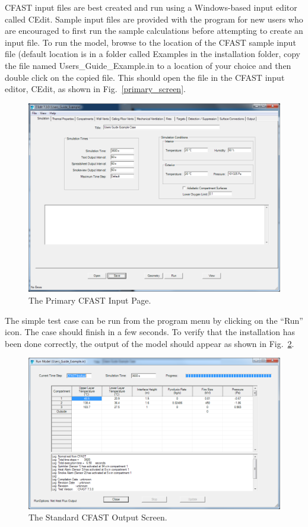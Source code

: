 CFAST input files are best created and run using a Windows-based input editor called CEdit. Sample input files are provided with the program for new users who are encouraged to first run the sample calculations before attempting to create an input file. To run the model, browse to the location of the CFAST sample input file (default location is in a folder called {\ct Examples} in the installation folder, copy the file named {\ct Users\_Guide\_Example.in} to a location of your choice and then double click on the copied file. This should open the file in the CFAST input editor, CEdit, as shown in Fig.~\ref{primary_screen}.
\begin{figure}[h!]
\includegraphics[width=6.5in]{FIGURES/Environment_Tab}
\caption[The Primary CFAST Input Page]{The Primary CFAST Input Page.}
\label{primary_screen}
\label{Figure 1.1}
\end{figure}
The simple test case can be run from the program menu by clicking on the ``Run'' icon. The case should finish in a few seconds. To verify that the installation has been done correctly, the output of the model should appear as shown in Fig.~\ref{Run_Model}.
\begin{figure}[h!]
\includegraphics[width=6.5in]{FIGURES/Standard_Output}
\caption[The Standard CFAST Output Screen]{The Standard CFAST Output Screen.}
\label{Run_Model}
\end{figure}


